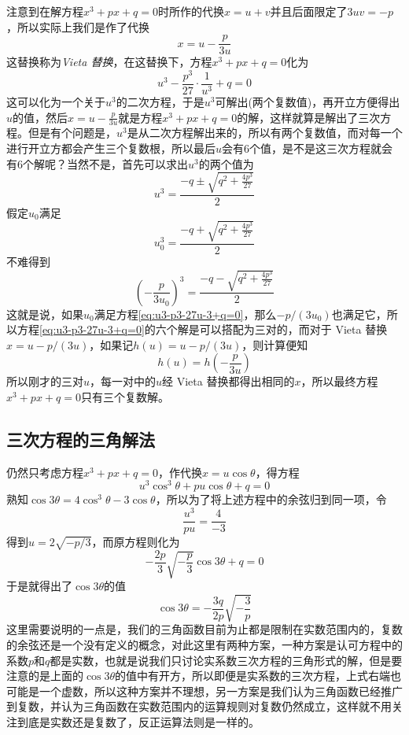 注意到在解方程$x^3+px+q=0$时所作的代换$x=u+v$并且后面限定了$3uv=-p$，所以实际上我们是作了代换
\begin{equation}
  \label{eq:vieta-substitution}
  x=u-\frac{p}{3u}
\end{equation}
这替换称为\emph{Vieta 替换}，在这替换下，方程$x^3+px+q=0$化为
\begin{equation}
  \label{eq:u3-p3-27u-3+q=0}
  u^3-\frac{p^3}{27}\cdot \frac{1}{u^3}+q=0 
\end{equation}
这可以化为一个关于$u^3$的二次方程，于是$u^3$可解出(两个复数值)，再开立方便得出$u$的值，然后$x=u-\frac{p}{3u}$就是方程$x^3+px+q=0$的解，这样就算是解出了三次方程。但是有个问题是，$u^3$是从二次方程解出来的，所以有两个复数值，而对每一个进行开立方都会产生三个复数根，所以最后$u$会有6个值，是不是这三次方程就会有6个解呢？当然不是，首先可以求出$u^3$的两个值为
\[ u^3=\frac{-q \pm \sqrt{q^2+\frac{4p^3}{27}}}{2} \]
假定$u_0$满足
\[ u_0^3=\frac{-q + \sqrt{q^2+\frac{4p^3}{27}}}{2} \]
不难得到
\[ \left( -\frac{p}{3u_0} \right)^3=\frac{-q - \sqrt{q^2+\frac{4p^3}{27}}}{2} \]
这就是说，如果$u_0$满足方程\ref{eq:u3-p3-27u-3+q=0}，那么$-p/(3u_0)$也满足它，所以方程\ref{eq:u3-p3-27u-3+q=0}的六个解是可以搭配为三对的，而对于 Vieta 替换$x=u-p/(3u)$，如果记$h(u)=u-p/(3u)$，则计算便知
\[ h(u)=h(-\frac{p}{3u}) \]
所以刚才的三对$u$，每一对中的$u$经 Vieta 替换都得出相同的$x$，所以最终方程$x^3+px+q=0$只有三个复数解。

\subsection{三次方程的三角解法}
\label{sec:cubic-equation-triangle-solved}

仍然只考虑方程$x^3+px+q=0$，作代换$x=u\cos{\theta}$，得方程
\[ u^3\cos^3{\theta}+pu\cos{\theta}+q=0 \]
熟知$\cos{3\theta}=4\cos^3{\theta}-3\cos{\theta}$，所以为了将上述方程中的余弦归到同一项，令
\[ \frac{u^3}{pu}=\frac{4}{-3} \]
得到$u=2\sqrt{-p/3}$，而原方程则化为
\[ -\frac{2p}{3}\sqrt{-\frac{p}{3}}\cos{3\theta}+q=0 \]
于是就得出了$\cos{3\theta}$的值
\[ \cos{3\theta}=-\frac{3q}{2p}\sqrt{-\frac{3}{p}} \]
这里需要说明的一点是，我们的三角函数目前为止都是限制在实数范围内的，复数的余弦还是一个没有定义的概念，对此这里有两种方案，一种方案是认可方程中的系数$p$和$q$都是实数，也就是说我们只讨论实系数三次方程的三角形式的解，但是要注意的是上面的$\cos{3\theta}$的值中有开方，所以即便是实系数的三次方程，上式右端也可能是一个虚数，所以这种方案并不理想，另一方案是我们认为三角函数已经推广到复数，并认为三角函数在实数范围内的运算规则对复数仍然成立，这样就不用关注到底是实数还是复数了，反正运算法则是一样的。

